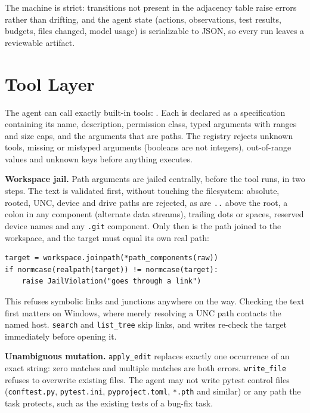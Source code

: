 \documentclass[conference]{IEEEtran}
\begin{document}
The machine is strict: transitions not present in the adjacency table raise
errors rather than drifting, and the agent state (actions, observations,
test results, budgets, files changed, model usage) is serializable to JSON,
so every run leaves a reviewable artifact.

\section{Tool Layer}
\label{sec:tools}
The agent can call exactly \ToolCount{} built-in tools: \ToolList. Each is
declared as a specification containing its name, description, permission
class, typed arguments with ranges and size caps, and the arguments that are
paths. The registry rejects unknown tools, missing or mistyped arguments
(booleans are not integers), out-of-range values and unknown keys before
anything executes.

\textbf{Workspace jail.} Path arguments are jailed centrally, before the
tool runs, in two steps. The text is validated first, without touching the
filesystem: absolute, rooted, UNC, device and drive paths are rejected, as
are \texttt{..} above the root, a colon in any component (alternate data
streams), trailing dots or spaces, reserved device names and any
\texttt{.git} component. Only then is the path joined to the workspace, and
the target must equal its own real path:
\begin{lstlisting}
target = workspace.joinpath(*path_components(raw))
if normcase(realpath(target)) != normcase(target):
    raise JailViolation("goes through a link")
\end{lstlisting}
This refuses symbolic links and junctions anywhere on the way. Checking the
text first matters on Windows, where merely resolving a UNC path contacts
the named host. \texttt{search} and \texttt{list\_tree} skip links, and
writes re-check the target immediately before opening it.

\textbf{Unambiguous mutation.} \texttt{apply\_edit} replaces exactly one
occurrence of an exact string: zero matches and multiple matches are both
errors. \texttt{write\_file} refuses to overwrite existing files. The agent
may not write pytest control files (\texttt{conftest.py},
\texttt{pytest.ini}, \texttt{pyproject.toml}, \texttt{*.pth} and similar)
or any path the task protects, such as the existing tests of a bug-fix task.
\end{document}
